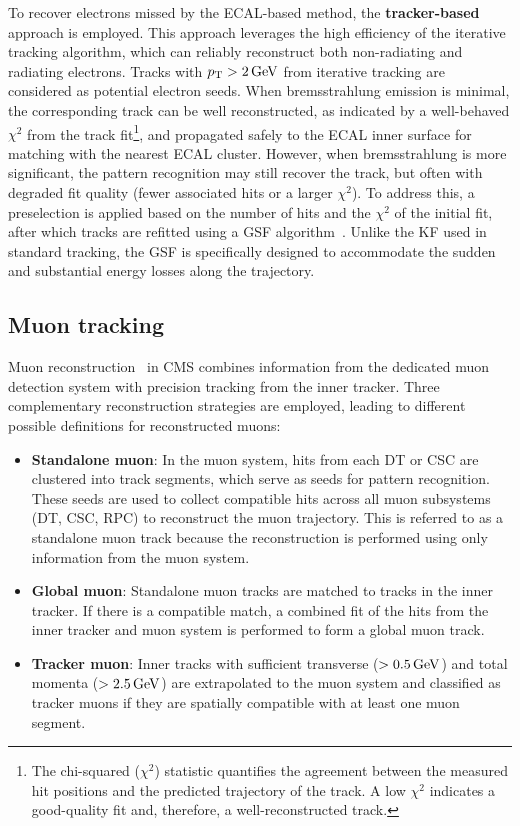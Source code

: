 To recover electrons missed by the ECAL-based method, the \textbf{tracker-based} approach is employed. This approach leverages the high efficiency of the iterative tracking algorithm, which can reliably reconstruct both non-radiating and radiating electrons. Tracks with $p_\mathrm{T} > 2\,\text{Ge\hspace{-.08em}V}$ from iterative tracking are considered as potential electron seeds. When bremsstrahlung emission is minimal, the corresponding track can be well reconstructed, as indicated by a well-behaved $\chi^2$ from the track fit\footnote{The chi-squared ($\chi^2$) statistic quantifies the agreement between the measured hit positions and the predicted trajectory of the track. A low $\chi^2$ indicates a good-quality fit and, therefore, a well-reconstructed track.}, and propagated safely to the ECAL inner surface for matching with the nearest ECAL cluster. However, when bremsstrahlung is more significant, the pattern recognition may still recover the track, but often with degraded fit quality (\ie fewer associated hits or a larger $\chi^2$). To address this, a preselection is applied based on the number of hits and the $\chi^2$ of the initial fit, after which tracks are refitted using a \ac{GSF} algorithm~\cite{GSF_Algorithm}. Unlike the KF used in standard tracking, the GSF is specifically designed to accommodate the sudden and substantial energy losses along the trajectory.

\subsection{Muon tracking}

Muon reconstruction~\cite{ParticleFlow} in CMS combines information from the dedicated muon detection system with precision tracking from the inner tracker. Three complementary reconstruction strategies are employed, leading to different possible definitions for reconstructed muons:

\begin{itemize}
    \item \textbf{Standalone muon}: In the muon system, hits from each DT or CSC are clustered into track segments, which serve as seeds for pattern recognition. These seeds are used to collect compatible hits across all muon subsystems (DT, CSC, RPC) to reconstruct the muon trajectory. This is referred to as a standalone muon track because the reconstruction is performed using only information from the muon system.
    \item \textbf{Global muon}: Standalone muon tracks are matched to tracks in the inner tracker. If there is a compatible match, a combined fit of the hits from the inner tracker and muon system is performed to form a global muon track.
    \item \textbf{Tracker muon}: Inner tracks with sufficient transverse ($> 0.5\,\text{Ge\hspace{-.08em}V}$) and total momenta ($>2.5\,\text{Ge\hspace{-.08em}V}$) are extrapolated to the muon system and classified as tracker muons if they are spatially compatible with at least one muon segment.
\end{itemize}

